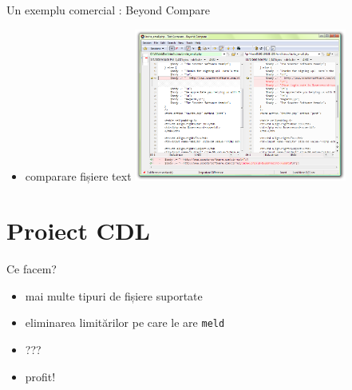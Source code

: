 \documentclass{beamer}
\begin{document}
\begin{frame}{Un exemplu comercial : Beyond Compare}
  \begin{itemize}      
      \item comparare fișiere text
        \includegraphics[height=5cm]{code/bc-text.png}
  \end{itemize}
\end{frame}









\section{Proiect CDL}
\frame{\tableofcontents[currentsection]}

\begin{frame}{Ce facem?}
  \begin{itemize}[<+->]
  \item mai multe tipuri de fișiere suportate
  \item eliminarea limitărilor pe care le are \texttt{meld}
  \item ???
  \item profit!
  \end{itemize}
\end{frame}
\end{document}

